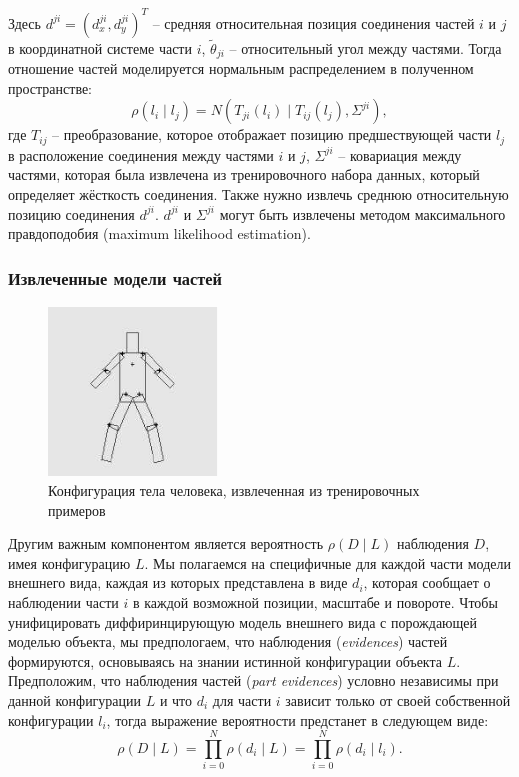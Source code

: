 Здесь \(d^{ji} = (d_x^{ji}, d_y^{ji})^T\) -- средняя относительная позиция соединения частей \(i\) и \(j\) в координатной системе части \(i\), \(\tilde{\theta}_{ji}\) -- относительный угол между частями. Тогда отношение частей моделируется нормальным распределением в полученном пространстве:
\begin{equation}
  \rho(l_i{\mid}l_j) = N(T_{ji}(l_i){\mid}T_{ij}(l_j), \Sigma^{ji}),
\end{equation}
где \(T_{ij}\) -- преобразование, которое отображает позицию предшествующей части \(l_j\) в расположение соединения между частями \(i\) и \(j\), \(\Sigma^{ji}\) -- ковариация между частями, которая была извлечена из тренировочного набора данных, который определяет жёсткость соединения. Также нужно извлечь среднюю относительную позицию соединения \(d^{ji}\). \(d^{ji}\) и \(\Sigma^{ji}\) могут быть извлечены методом максимального правдоподобия (maximum likelihood estimation).

\subsubsection{Извлеченные модели частей}

\begin{figure}
  \centering
  \includegraphics[width=0.4\textwidth]{images/detection-learned-body.png}
  \caption{Конфигурация тела человека, извлеченная из тренировочных примеров\label{detection-learned-body}}
\end{figure}

Другим важным компонентом является вероятность \(\rho(D{\mid}L)\) наблюдения \(D\), имея конфигурацию \(L\). Мы полагаемся на специфичные для каждой части модели внешнего вида, каждая из которых представлена в виде \(d_i\), которая сообщает о наблюдении части \(i\) в каждой возможной позиции, масштабе и повороте. Чтобы унифицировать диффиринцирующую модель внешнего вида с порождающей моделью объекта, мы предпологаем, что наблюдения (\emph{evidences}) частей формируются, основываясь на знании истинной конфигурации объекта \(L\). Предположим, что наблюдения частей (\emph{part evidences}) условно независимы при данной конфигурации \(L\) и что \(d_i\) для части \(i\) зависит только от своей собственной конфигурации \(l_i\), тогда выражение вероятности предстанет в следующем виде:
\begin{equation}
  \rho(D{\mid}L) = \prod_{i = 0}^N\rho(d_i{\mid}L) = \prod_{i = 0}^N\rho(d_i{\mid}l_i).
\end{equation}

